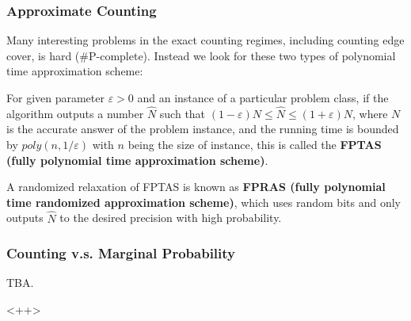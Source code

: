 \documentclass[mathserif]{beamer}
\newcommand{\eps}{\varepsilon}
\begin{document}
\begin{frame}
	\frametitle{Approximate Counting}
	Many interesting problems in the exact counting regimes, including counting edge cover, is hard (\#P-complete).
	Instead we look for these two types of polynomial time approximation scheme:
	\pause
	\begin{definition}[FPTAS]
		For given parameter $\eps > 0$ and an instance of a particular problem class, if the algorithm outputs a number $\hat{N}$ such that $(1-\eps) N \leq \hat{N} \leq (1+\eps) N$, where $N$ is the accurate answer of the problem instance, and the running time is bounded by $poly(n, 1/ \eps)$ with $n$ being the size of instance, this is called the {\bf FPTAS (fully polynomial time approximation scheme)}.

	\end{definition}
	\pause
	\begin{definition}[FPRAS]
		A randomized relaxation of FPTAS is known as {\bf FPRAS (fully polynomial time randomized approximation scheme)}, which uses random bits and only outputs $\hat{N}$ to the desired precision with high probability.
	\end{definition}
\end{frame}

\begin{frame}
	\frametitle{Counting v.s. Marginal Probability}
	TBA.
\end{frame}<++>
\end{document}
